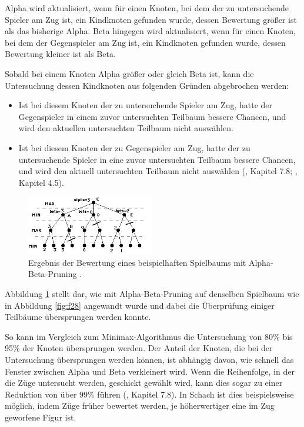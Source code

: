 Alpha wird aktualisiert, wenn für einen Knoten, bei dem der zu untersuchende Spieler am Zug ist, ein Kindknoten gefunden wurde, dessen Bewertung größer ist als das bisherige Alpha. Beta hingegen wird aktualisiert, wenn für einen Knoten, bei dem der Gegenspieler am Zug ist, ein Kindknoten gefunden wurde, dessen Bewertung kleiner ist als Beta.

Sobald bei einem Knoten Alpha größer oder gleich Beta ist, kann die Untersuchung dessen Kindknoten aus folgenden Gründen abgebrochen werden:

\begin{itemize}
	\item Ist bei diesem Knoten der zu untersuchende Spieler am Zug, hatte der Gegenspieler in einem zuvor untersuchten Teilbaum bessere Chancen, und wird den aktuellen untersuchten Teilbaum nicht auswählen.
	\item Ist bei diesem Knoten der zu Gegenspieler am Zug, hatte der zu untersuchende Spieler in eine zuvor untersuchten Teilbaum bessere Chancen, und wird den aktuell untersuchten Teilbaum nicht auswählen (\cite{Heineman.October2008}, Kapitel 7.8; \cite{Ferguson.January2019}, Kapitel 4.5).
\end{itemize}

\begin{figure}[ht!]%
	\includegraphics[width=0.5\textwidth, center]{Bilder/alphabeta.png}
	\caption[Ergebnis der Bewertung eines beispielhaften Spielbaums mit Alpha-Beta-Pruning.]{Ergebnis der Bewertung eines beispielhaften Spielbaums mit Alpha-Beta-Pruning \cite{Morelli_Minimax}.}
	\label{fig:f29}
\end{figure}

Abbildung \ref{fig:f29} stellt dar, wie mit Alpha-Beta-Pruning auf denselben Spielbaum wie in Abbildung \ref{fig:f28} angewandt wurde und dabei die Überprüfung einiger Teilbäume übersprungen werden konnte.

So kann im Vergleich zum Minimax-Algorithmus die Untersuchung von 80\% bis 95\% der Knoten übersprungen werden. Der Anteil der Knoten, die bei der Untersuchung übersprungen werden können, ist abhängig davon, wie schnell das Fenster zwischen Alpha und Beta verkleinert wird. Wenn die Reihenfolge, in der die Züge untersucht werden, geschickt gewählt wird, kann dies sogar zu einer Reduktion von über 99\% führen (\cite{Heineman.October2008}, Kapitel 7.8). In Schach ist dies beispielsweise möglich, indem Züge früher bewertet werden, je höherwertiger eine im Zug geworfene Figur ist.

